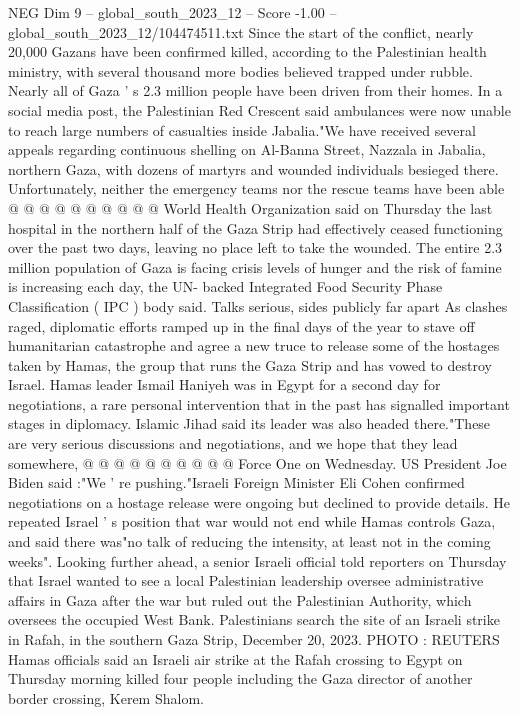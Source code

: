 \begin{textsample}{NEG Dim 9 – global\_south\_2023\_12 – Score -1.00 – global\_south\_2023\_12/104474511.txt}
Since the start of the conflict, nearly 20,000 Gazans have been confirmed killed, according to the Palestinian health ministry, with several thousand more bodies believed trapped under rubble.
Nearly all of Gaza ' s 2.3 million people have been driven from their homes.
In a social media post, the Palestinian Red Crescent said ambulances were now unable to reach large numbers of casualties inside Jabalia."We have received several appeals regarding continuous shelling on Al-Banna Street, Nazzala in Jabalia, northern Gaza, with dozens of martyrs and wounded individuals besieged there.
Unfortunately, neither the emergency teams nor the rescue teams have been able @ @ @ @ @ @ @ @ @ @ World Health Organization said on Thursday the last hospital in the northern half of the Gaza Strip had effectively ceased functioning over the past two days, leaving no place left to take the wounded.
The entire 2.3 million population of Gaza is facing crisis levels of hunger and the risk of famine is increasing each day, the UN- backed Integrated Food Security Phase Classification ( IPC ) body said.
Talks serious, sides publicly far apart As clashes raged, diplomatic efforts ramped up in the final days of the year to stave off humanitarian catastrophe and agree a new truce to release some of the hostages taken by Hamas, the group that runs the Gaza Strip and has vowed to destroy Israel.
Hamas leader Ismail Haniyeh was in Egypt for a second day for negotiations, a rare personal intervention that in the past has signalled important stages in diplomacy.
Islamic Jihad said its leader was also headed there."These are very serious discussions and negotiations, and we hope that they lead somewhere, @ @ @ @ @ @ @ @ @ @ Force One on Wednesday.
US President Joe Biden said :"We ' re pushing."Israeli Foreign Minister Eli Cohen confirmed negotiations on a hostage release were ongoing but declined to provide details.
He repeated Israel ' s position that war would not end while Hamas controls Gaza, and said there was"no talk of reducing the intensity, at least not in the coming weeks".
Looking further ahead, a senior Israeli official told reporters on Thursday that Israel wanted to see a local Palestinian leadership oversee administrative affairs in Gaza after the war but ruled out the Palestinian Authority, which oversees the occupied West Bank.
Palestinians search the site of an Israeli strike in Rafah, in the southern Gaza Strip, December 20, 2023.
PHOTO : REUTERS Hamas officials said an Israeli air strike at the Rafah crossing to Egypt on Thursday morning killed four people including the Gaza director of another border crossing, Kerem Shalom.

\end{textsample}
